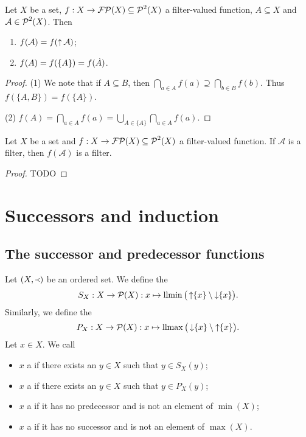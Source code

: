 \begin{lemma}
Let $X$ be a set, $f: X\to \operatorname{\mathcal{FP}}(X) \subseteq \operatorname{\mathcal{P}}^2(X)$ a filter-valued function, $A\subseteq X$ and $\mathcal{A}\in\operatorname{\mathcal{P}}^2(X)$. Then
\begin{enumerate}
\item $f(\mathcal{A}) = f(\operatorname{\uparrow}\mathcal{A})$;
\item $f(A) = f(\{A\}) = f(\dot{A})$.
\end{enumerate}
\end{lemma}
\begin{proof}
(1) We note that if $A\subseteq B$, then $\bigcap_{a\in A} f(a) \supseteq \bigcap_{b\in B} f(b)$. Thus $f(\{A,B\}) = f(\{A\})$.

(2) $f(A) = \bigcap_{a\in A} f(a) = \bigcup_{A\in\{A\}}\bigcap_{a\in A} f(a)$.
\end{proof}

\begin{proposition}
Let $X$ be a set and $f: X\to \operatorname{\mathcal{FP}}(X) \subseteq \operatorname{\mathcal{P}}^2(X)$ a filter-valued function. If $\mathcal{A}$ is a filter, then $f(\mathcal{A})$ is a filter.
\end{proposition}
\begin{proof}
TODO
\end{proof}

\chapter{Successors and induction}
\section{The successor and predecessor functions}


\begin{definition}
Let $\sSet{X,\Yleft}$ be an ordered set. We define the 
\[ S_X: X \to \operatorname{\mathcal{P}}(X): x\mapsto \operatorname{llmin}\big(\operatorname{\uparrow}\{x\}\setminus \operatorname{\downarrow}\{x\}\big). \]
Similarly, we define the 
\[ P_X: X\to \operatorname{\mathcal{P}}(X): x\mapsto \operatorname{llmax}\big(\operatorname{\downarrow}\{x\}\setminus \operatorname{\uparrow}\{x\}\big). \]
Let $x\in X$. We call
\begin{itemize}
\item $x$ a  if there exists an $y\in X$ such that $y\in S_X(y)$;
\item $x$ a  if there exists an $y\in X$ such that $y\in P_X(y)$;
\item $x$ a  if it has no predecessor and is not an element of $\min(X)$;
\item $x$ a  if it has no successor and is not an element of $\max(X)$.
\end{itemize}
\end{definition}

